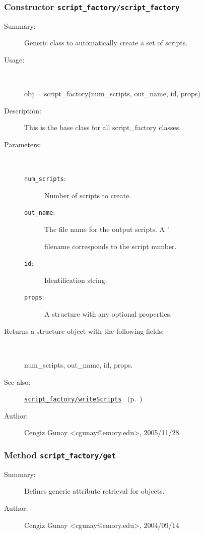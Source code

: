 \subsubsection[Constructor \texttt{script\_factory}]{Constructor \texttt{script\_factory/script\_factory}}%
%
\label{ref_script_factory__script_factory}%
\hypertarget{ref_script_factory__script_factory}{}%
\begin{description}
\item[Summary:]Generic class to automatically create a set of scripts.
%
\item[Usage:]~%
\begin{lyxcode}%
obj = script\_factory(num\_scripts, out\_name, id, props)
%
\end{lyxcode}%
%
\item[Description:]%
This is the base class for all script\_factory classes.
\item[Parameters:]~
\begin{description}%
\item[\texttt{num\_scripts}:]
 Number of scripts to create.
\item[\texttt{out\_name}:]
 The file name for the output scripts. A '%

filename corresponds to the script number.
\item[\texttt{id}:]
 Identification string.
\item[\texttt{props}:]
 A structure with any optional properties.
\end{description}%
%
\item[Returns a structure object with the following fields:
]~

	num\_scripts, out\_name, id, props.
%
%
\item[See also:]%
\hyperlink{ref_script_factory__writeScripts}{\texttt{script\_factory/writeScripts}}%
\ (p.~\pageref{ref_script_factory__writeScripts})%
%
%
\item[Author:]%
Cengiz Gunay <cgunay@emory.edu>, 2005/11/28
%
\end{description}
\methodline%
\subsubsection[Method \texttt{get}]{Method \texttt{script\_factory/get}}%
%
\label{ref_script_factory__get}%
\hypertarget{ref_script_factory__get}{}%
\begin{description}
\item[Summary:]Defines generic attribute retrieval for objects.
%
%
%
%
%
%
%
\item[Author:]%
Cengiz Gunay <cgunay@emory.edu>, 2004/09/14
%
\end{description}
\methodline%
